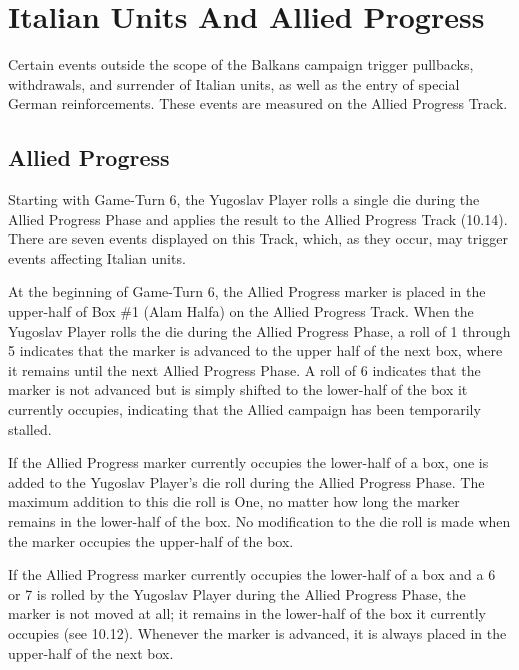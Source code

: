 \section{Italian Units And Allied Progress}\label{sec:10.0}


\begin{generalrule}
Certain events outside the scope of the Balkans campaign trigger pullbacks, withdrawals, and surrender of Italian units, as well as the entry of special German reinforcements. These events are measured on the Allied Progress Track.
\end{generalrule}

\subsection{Allied Progress}\label{sec:10.1}

Starting with Game-Turn 6, the Yugoslav Player rolls a single die during the Allied Progress Phase and applies the result to the Allied Progress Track (10.14). There are seven events displayed on this Track, which, as they occur, may trigger events affecting Italian units.

 At the beginning of Game-Turn 6, the Allied Progress marker is placed in the upper-half of Box \#1 (Alam Halfa) on the Allied Progress Track. When the Yugoslav Player rolls the die during the Allied Progress Phase, a roll of 1 through 5 indicates that the marker is advanced to the upper half of the next box, where it remains until the next Allied Progress Phase. A roll of 6 indicates that the marker is not advanced but is simply shifted to the lower-half of the box it currently occupies, indicating that the Allied campaign has been temporarily stalled.

 If the Allied Progress marker currently occupies the lower-half of a box, one is added to the Yugoslav Player’s die roll during the Allied Progress Phase. The maximum addition to this die roll is One, no matter how long the marker remains in the lower-half of the box. No modification to the die roll is made when the marker occupies the upper-half of the box.

 If the Allied Progress marker currently occupies the lower-half of a box and a 6 or 7 is rolled by the Yugoslav Player during the Allied Progress Phase, the marker is not moved at all; it remains in the lower-half of the box it currently occupies (see 10.12). Whenever the marker is advanced, it is always placed in the upper-half of the next box.

